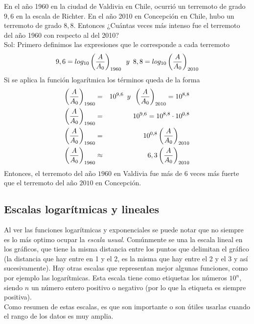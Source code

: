 \begin{mydef}
En el año 1960 en la ciudad de Valdivia en Chile, ocurrió un terremoto de grado $9,6$ en la escala de Richter. En el año 2010 en Concepción en Chile, hubo un terremoto de grado $8,8$. Entonces ¿Cuántas veces más intenso fue el terremoto del año 1960 con respecto al del 2010?\\

\noindent Sol: Primero definimos las expresiones que le corresponde a cada terremoto
\begin{eqnarray*}
9,6=log_{10}\left(\dfrac{A}{A_{0}}\right)_{1960} \hspace{5px} y \hspace{5px}8,8=log_{10}\left(\dfrac{A}{A_{0}}\right)_{2010}
\end{eqnarray*}
Si se aplica la función logarítmica los términos queda de la forma
\begin{eqnarray*}
\left(\dfrac{A}{A_{0}}\right)_{1960}&=&10^{9,6} \hspace{5px} y \hspace{5px} \left(\dfrac{A}{A_{0}}\right)_{2010} = 10^{8,8}\\
\left(\dfrac{A}{A_{0}}\right)_{1960}&=&10^{9,6}=10^{8,8}\cdot 10^{0,8}\\
\left(\dfrac{A}{A_{0}}\right)_{1960}&=&10^{0,8}\left(\dfrac{A}{A_{0}}\right)_{2010}\\
\left(\dfrac{A}{A_{0}}\right)_{1960}&\approx & 6,3\left(\dfrac{A}{A_{0}}\right)_{2010}
\end{eqnarray*}
Entonces, el terremoto del año $1960$ en Valdivia fue más de $6$ veces más fuerte que el terremoto del año $2010$ en Concepción.
\end{mydef}

\subsection{Escalas logarítmicas y lineales}
Al ver las funciones logarítmicas y exponenciales se puede notar que no siempre es lo más optimo ocupar la \textit{escala usual}.  Comúnmente se una la escala lineal en los gráficos, que tiene la misma distancia entre los puntos que delimitan el gráfico (la distancia que hay entre en 1 y el 2, es la misma que hay entre el 2 y el 3 y así sucesivamente). Hay otras escalas que representan mejor algunas funciones, como por ejemplo las logarítmicas. Esta escala tiene como etiquetas los números $10^{n}$, siendo $n$ un número entero positivo o negativo (por lo que la etiqueta es siempre positiva).\\
Como resumen de estas escalas, es que son importante o son útiles usarlas cuando el rango de los datos es muy amplia.\\

